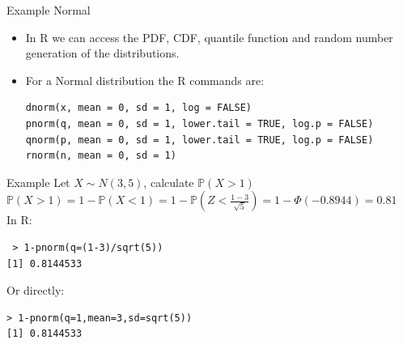 \documentclass[handout]{beamer}
\begin{document}
\begin{frame}[fragile]{Example Normal}
\scriptsize{
\begin{itemize}
 \item In R we can access the PDF, CDF, quantile function and random number generation of the distributions.
 \item For a Normal distribution the R commands are:
\begin{verbatim}
dnorm(x, mean = 0, sd = 1, log = FALSE)
pnorm(q, mean = 0, sd = 1, lower.tail = TRUE, log.p = FALSE)
qnorm(p, mean = 0, sd = 1, lower.tail = TRUE, log.p = FALSE)
rnorm(n, mean = 0, sd = 1) 
\end{verbatim}
 
\end{itemize}

\begin{block}{Example}
Let $X\sim N(3,5)$, calculate $\mathbb{P}(X > 1)$ \\
$\mathbb{P}(X >1) = 1-\mathbb{P}(X<1) = 1-\mathbb{P}(Z < \frac{1-3}{\sqrt{5}})=1-\Phi(-0.8944)= 0.81$ \\
In R:
\begin{verbatim}
 > 1-pnorm(q=(1-3)/sqrt(5))
[1] 0.8144533
\end{verbatim}
Or directly:
\begin{verbatim}
> 1-pnorm(q=1,mean=3,sd=sqrt(5))
[1] 0.8144533 
\end{verbatim}
\end{block}
}
\end{frame}
\end{document}
